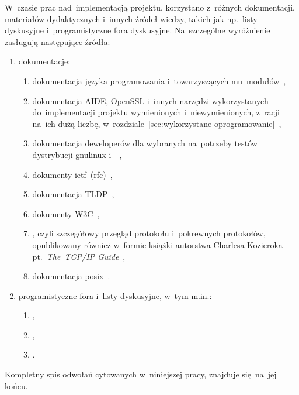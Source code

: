 \documentclass[thesis]{subfiles}
\begin{document}
W~czasie prac nad~implementacją projektu, korzystano z~różnych dokumentacji, materiałów dydaktycznych i~innych źródeł wiedzy, takich jak np.~listy dyskusyjne i~programistyczne fora dyskusyjne. Na~szczególne wyróżnienie zasługują następujące źródła:\mynobreakpar
\begin{enumerate}
	\item dokumentacje:\mynobreakpar
	\begin{enumerate}
		\item dokumentacja języka programowania \python{} i~towarzyszących mu~modułów~\cite{python-doc},%
		\item dokumentacja \hyperref[sec:aide]{AIDE}, \href{https://en.wikipedia.org/wiki/OpenSSL}{OpenSSL} i~innych narzędzi wykorzystanych do~implementacji projektu wymienionych i~niewymienionych, z~racji na~ich dużą liczbę, w~rozdziale~\ref{sec:wykorzystane-oprogramowanie}~\cite{openssl-doc},
		\item dokumentacja deweloperów dla wybranych na~potrzeby testów dystrybucji \gls{gnulinux} \debian{} i~\arch{}~\cite{archlinux-wiki,debian-wiki},
		\item dokumenty \gls{ietf}~(\gls{rfc})~\cite{rfc-editor},
		\item dokumentacja TLDP~\cite{tldp},
		\item dokumenty W3C~\cite{w3c},
		\item {}, czyli szczegółowy przegląd protokołu  i~pokrewnych protokołów, opublikowany również w~formie książki autorstwa \href{https://www.linkedin.com/in/charles-kozierok-708112/}{\mbox{Charlesa} \mbox{Kozieroka}} pt.~\emph{The~TCP/IP Guide}~\cite{tcpguide-book},
		\item dokumentacja \gls{posix}~\cite{posix}.
	\end{enumerate}
	\item programistyczne fora i~listy dyskusyjne, w~tym m.in.:\mynobreakpar
	\begin{enumerate}
		\item {},
		\item {},
		\item {}.
	\end{enumerate}
\end{enumerate}
Kompletny spis odwołań cytowanych w~niniejszej pracy, znajduje się~na~jej \hyperref[bibliography-page]{końcu}. %
\end{document}
